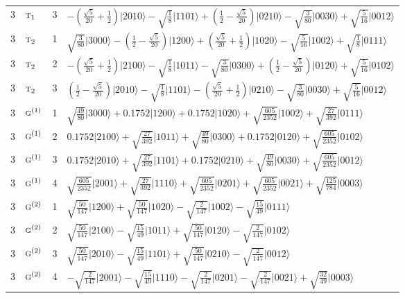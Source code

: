 \documentclass[11pt]{article}
\newcommand{\irr}[1]{\text{\normalfont\scshape #1}}
\newcommand{\occ}[1]{\lvert #1\rangle}
\begin{document}
\begin{longtable}{c l c p{}}
3 & $\irr{t}_{1}$ & 3 & $-(\frac{\sqrt{5}}{20} + \frac{1}{2})\occ{2010}-\sqrt{\tfrac{1}{8}}\occ{1101}+(\frac{1}{2} - \frac{\sqrt{5}}{20})\occ{0210}-\sqrt{\tfrac{3}{80}}\occ{0030}+\sqrt{\tfrac{5}{16}}\occ{0012}$\\
3 & $\irr{t}_{2}$ & 1 & $\sqrt{\tfrac{3}{80}}\occ{3000}-(\frac{1}{2} - \frac{\sqrt{5}}{20})\occ{1200}+(\frac{\sqrt{5}}{20} + \frac{1}{2})\occ{1020}-\sqrt{\tfrac{5}{16}}\occ{1002}+\sqrt{\tfrac{1}{8}}\occ{0111}$\\
3 & $\irr{t}_{2}$ & 2 & $-(\frac{\sqrt{5}}{20} + \frac{1}{2})\occ{2100}-\sqrt{\tfrac{1}{8}}\occ{1011}-\sqrt{\tfrac{3}{80}}\occ{0300}+(\frac{1}{2} - \frac{\sqrt{5}}{20})\occ{0120}+\sqrt{\tfrac{5}{16}}\occ{0102}$\\
3 & $\irr{t}_{2}$ & 3 & $(\frac{1}{2} - \frac{\sqrt{5}}{20})\occ{2010}-\sqrt{\tfrac{1}{8}}\occ{1101}-(\frac{\sqrt{5}}{20} + \frac{1}{2})\occ{0210}-\sqrt{\tfrac{3}{80}}\occ{0030}+\sqrt{\tfrac{5}{16}}\occ{0012}$\\
3 & $\irr{g}^{(1)}$ & 1 & $\sqrt{\tfrac{49}{80}}\occ{3000}+0.1752\occ{1200}+0.1752\occ{1020}+\sqrt{\tfrac{605}{2352}}\occ{1002}+\sqrt{\tfrac{27}{392}}\occ{0111}$\\
3 & $\irr{g}^{(1)}$ & 2 & $0.1752\occ{2100}+\sqrt{\tfrac{27}{392}}\occ{1011}+\sqrt{\tfrac{49}{80}}\occ{0300}+0.1752\occ{0120}+\sqrt{\tfrac{605}{2352}}\occ{0102}$\\
3 & $\irr{g}^{(1)}$ & 3 & $0.1752\occ{2010}+\sqrt{\tfrac{27}{392}}\occ{1101}+0.1752\occ{0210}+\sqrt{\tfrac{49}{80}}\occ{0030}+\sqrt{\tfrac{605}{2352}}\occ{0012}$\\
3 & $\irr{g}^{(1)}$ & 4 & $\sqrt{\tfrac{605}{2352}}\occ{2001}+\sqrt{\tfrac{27}{392}}\occ{1110}+\sqrt{\tfrac{605}{2352}}\occ{0201}+\sqrt{\tfrac{605}{2352}}\occ{0021}+\sqrt{\tfrac{125}{784}}\occ{0003}$\\
3 & $\irr{g}^{(2)}$ & 1 & $\sqrt{\tfrac{50}{147}}\occ{1200}+\sqrt{\tfrac{50}{147}}\occ{1020}-\sqrt{\tfrac{2}{147}}\occ{1002}-\sqrt{\tfrac{15}{49}}\occ{0111}$\\
3 & $\irr{g}^{(2)}$ & 2 & $\sqrt{\tfrac{50}{147}}\occ{2100}-\sqrt{\tfrac{15}{49}}\occ{1011}+\sqrt{\tfrac{50}{147}}\occ{0120}-\sqrt{\tfrac{2}{147}}\occ{0102}$\\
3 & $\irr{g}^{(2)}$ & 3 & $\sqrt{\tfrac{50}{147}}\occ{2010}-\sqrt{\tfrac{15}{49}}\occ{1101}+\sqrt{\tfrac{50}{147}}\occ{0210}-\sqrt{\tfrac{2}{147}}\occ{0012}$\\
3 & $\irr{g}^{(2)}$ & 4 & $-\sqrt{\tfrac{2}{147}}\occ{2001}-\sqrt{\tfrac{15}{49}}\occ{1110}-\sqrt{\tfrac{2}{147}}\occ{0201}-\sqrt{\tfrac{2}{147}}\occ{0021}+\sqrt{\tfrac{32}{49}}\occ{0003}$\\

\end{longtable}
\end{document}
